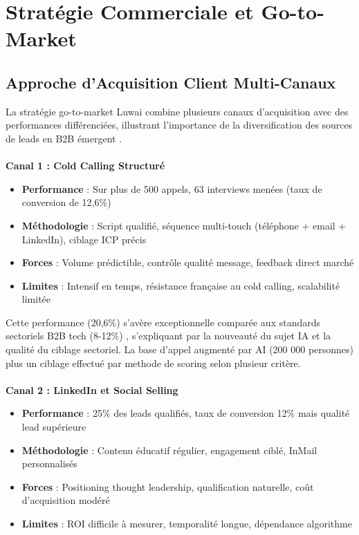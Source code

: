 \section{Stratégie Commerciale et Go-to-Market}

\subsection{Approche d'Acquisition Client Multi-Canaux}

La stratégie go-to-market Luwai combine plusieurs canaux d'acquisition avec des performances différenciées, illustrant l'importance de la diversification des sources de leads en B2B émergent \cite{weinberg2015traction}.
\\\\
\textbf{Canal 1 : Cold Calling Structuré}
\begin{itemize}
    \item \textbf{Performance} : Sur plus de 500 appels, 63 interviews menées (taux de conversion de 12,6\%)
    \item \textbf{Méthodologie} : Script qualifié, séquence multi-touch (téléphone + email + LinkedIn), ciblage ICP précis
    \item \textbf{Forces} : Volume prédictible, contrôle qualité message, feedback direct marché
    \item \textbf{Limites} : Intensif en temps, résistance française au cold calling, scalabilité limitée
\end{itemize}
\medskip
Cette performance (20,6\%) s'avère exceptionnelle comparée aux standards sectoriels B2B tech (8-12\%) \cite{salesforce2024benchmarks}, s'expliquant par la nouveauté du sujet IA et la qualité du ciblage sectoriel. La base d'appel augmenté par AI (200 000 personnes) plus un ciblage effectué par methode de scoring selon plusieur critère.
\\\\
\textbf{Canal 2 : LinkedIn et Social Selling}
\begin{itemize}
    \item \textbf{Performance} : 25\% des leads qualifiés, taux de conversion 12\% mais qualité lead supérieure
    \item \textbf{Méthodologie} : Contenu éducatif régulier, engagement ciblé, InMail personnalisés
    \item \textbf{Forces} : Positioning thought leadership, qualification naturelle, coût d'acquisition modéré
    \item \textbf{Limites} : ROI difficile à mesurer, temporalité longue, dépendance algorithme
\end{itemize}
